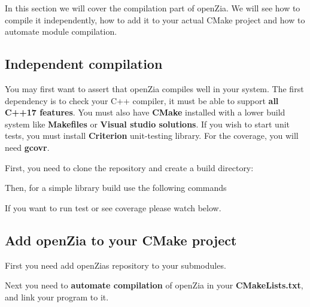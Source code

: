 In this section we will cover the compilation part of open\+Zia. We will see how to compile it independently, how to add it to your actual C\+Make project and how to automate module compilation.

\subsection*{Independent compilation}

You may first want to assert that open\+Zia compiles well in your system. The first dependency is to check your C++ compiler, it must be able to support {\bfseries{all C++17 features}}. You must also have {\bfseries{C\+Make}} installed with a lower build system like {\bfseries{Makefiles}} or {\bfseries{Visual studio solutions}}. If you wish to start unit tests, you must install {\bfseries{Criterion}} unit-\/testing library. For the coverage, you will need {\bfseries{gcovr}}.

First, you need to clone the repository and create a build directory\+: 
\begin{DoxyCode}{0}
\end{DoxyCode}


Then, for a simple library build use the following commands 
\begin{DoxyCode}{0}
\end{DoxyCode}
 If you want to run test or see coverage please watch below.

\subsection*{Add open\+Zia to your C\+Make project}

First you need add open\+Zia\textquotesingle{}s repository to your submodules. 
\begin{DoxyCode}{0}
\end{DoxyCode}


Next you need to {\bfseries{automate compilation}} of open\+Zia in your {\bfseries{C\+Make\+Lists.\+txt}}, and link your program to it. 
\begin{DoxyCode}{0}
\DoxyCodeLine{}
\DoxyCodeLine{}
\end{DoxyCode}


